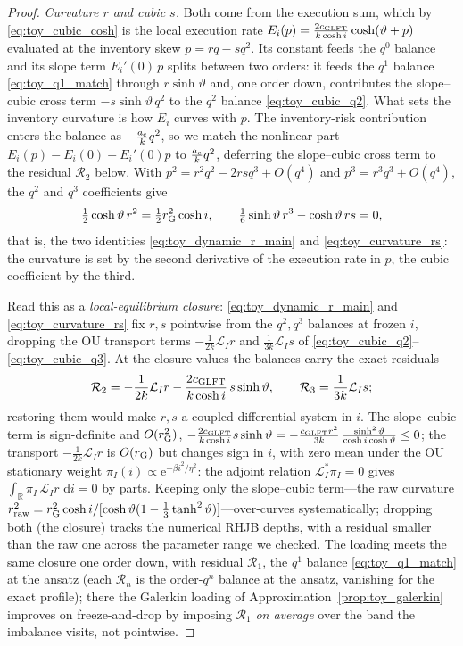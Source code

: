 \documentclass[11pt,a4paper]{article}
\newcommand{\R}{\mathbb{R}}
\newcommand{\Lcal}{\mathcal{L}}
\newcommand{\dd}{\,\mathrm{d}}
\newcommand{\e}{\mathrm e}
\theoremstyle{plain}
\theoremstyle{definition}
\begin{document}
\begin{proof}
\emph{Curvature \(r\) and cubic \(s\).}  Both come from the execution sum,
which by \eqref{eq:toy_cubic_cosh} is the local execution rate
\(E_i(p)=\tfrac{2c_{\rm GLFT}}{k\cosh i}\cosh(\vartheta+p)\) evaluated at the
inventory skew \(p=rq-sq^2\).  Its constant feeds the \(q^0\) balance and its
slope term \(E_i'(0)\,p\) splits between two orders: it feeds the \(q^1\)
balance \eqref{eq:toy_q1_match} through \(r\sinh\vartheta\) and, one order
down, contributes the slope--cubic cross term \(-s\sinh\vartheta\,q^2\) to
the \(q^2\) balance \eqref{eq:toy_cubic_q2}.  What sets the inventory curvature is how
\(E_i\) curves with \(p\).  The inventory-risk contribution enters the balance
as \(-\tfrac{a_{\rm c}}{k}q^2\), so we match the nonlinear part
\(E_i(p)-E_i(0)-E_i'(0)p\) to \(\tfrac{a_{\rm c}}{k}q^2\), deferring the
slope--cubic cross term to the residual \(\mathcal R_2\) below.  With
\(p^2=r^2q^2-2rsq^3+O(q^4)\) and \(p^3=r^3q^3+O(q^4)\), the \(q^2\) and
\(q^3\) coefficients give
\[
\tfrac12\cosh\vartheta\,r^2=\tfrac12 r_{\rm G}^2\cosh i,
\qquad
\tfrac16\sinh\vartheta\,r^3-\cosh\vartheta\,rs=0,
\]
that is, the two identities \eqref{eq:toy_dynamic_r_main} and
\eqref{eq:toy_curvature_rs}: the curvature is set by the second derivative of
the execution rate in \(p\), the cubic coefficient by the third.

Read this as a \emph{local-equilibrium closure}: \eqref{eq:toy_dynamic_r_main}
and \eqref{eq:toy_curvature_rs} fix \(r,s\) pointwise from the \(q^2,q^3\)
balances at frozen \(i\), dropping the OU transport terms
\(-\tfrac1{2k}\Lcal_I r\) and \(\tfrac1{3k}\Lcal_I s\) of
\eqref{eq:toy_cubic_q2}--\eqref{eq:toy_cubic_q3}.  At the closure values the
balances carry the exact residuals
\[
\mathcal R_2=-\frac{1}{2k}\Lcal_I r
-\frac{2c_{\rm GLFT}}{k\cosh i}\,s\sinh\vartheta,
\qquad
\mathcal R_3=\frac{1}{3k}\Lcal_I s ;
\]
restoring them would make \(r,s\) a coupled differential system in \(i\).  The
slope--cubic term is sign-definite and \(O(r_{\rm G}^2)\),
\(-\tfrac{2c_{\rm GLFT}}{k\cosh i}s\sinh\vartheta
=-\tfrac{c_{\rm GLFT}r^2}{3k}\,
\tfrac{\sinh^2\vartheta}{\cosh i\cosh\vartheta}\le0\);
the transport \(-\tfrac1{2k}\Lcal_I r\) is \(O(r_{\rm G})\) but changes sign in
\(i\), with zero mean under the OU stationary weight
\(\pi_I(i)\propto\e^{-\beta i^2/\eta^2}\): the adjoint relation
\(\Lcal_I^*\pi_I=0\) gives \(\int_{\R}\pi_I\,\Lcal_I r\,\dd i=0\) by parts.
Keeping only the slope--cubic term---the raw curvature
\(r_{\rm raw}^2=r_{\rm G}^2\cosh i/
[\cosh\vartheta(1-\tfrac13\tanh^2\vartheta)]\)---over-curves
systematically; dropping both (the closure) tracks the numerical RHJB depths,
with a residual smaller than the raw one across the parameter range we
checked.  The loading meets the same closure one order down, with residual
\(\mathcal R_1\), the \(q^1\) balance \eqref{eq:toy_q1_match} at the ansatz
(each \(\mathcal R_n\) is the order-\(q^n\) balance at the ansatz, vanishing
for the exact profile); there the Galerkin loading of
Approximation~\ref{prop:toy_galerkin} improves on freeze-and-drop by imposing
\(\mathcal R_1\) \emph{on average} over the band the imbalance visits, not
pointwise.


\end{proof}
\end{document}
